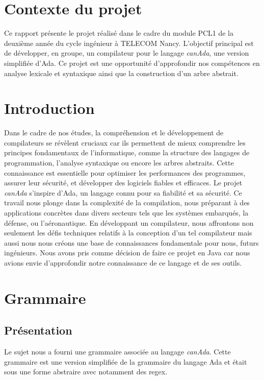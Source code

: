 \documentclass[french,a4paper]{article}
\begin{document}
    \section{Contexte du projet}\label{sec:contexte-du-projet}
    Ce rapport présente le projet réalisé dans le cadre du module PCL1 de la deuxième année du cycle ingénieur à TELECOM Nancy.
    L'objectif principal est de développer, en groupe, un compilateur pour le langage \textit{canAda}, une version simplifiée d'Ada.
    Ce projet est une opportunité d'approfondir nos compétences en analyse lexicale et syntaxique ainsi que la construction d'un arbre abstrait.

    \section{Introduction}\label{sec:introduction}
    Dans le cadre de nos études, la compréhension et le développement de compilateurs se révèlent cruciaux car ils permettent de mieux comprendre les principes fondamentaux de l'informatique, comme la structure des langages de programmation, l'analyse syntaxique ou encore les arbres abstraits.
    Cette connaissance est essentielle pour optimiser les performances des programmes, assurer leur sécurité, et développer des logiciels fiables et efficaces.
    Le projet \textit{canAda} s'inspire d'Ada, un langage connu pour sa fiabilité et sa sécurité.
    Ce travail nous plonge dans la complexité de la compilation, nous préparant à des applications concrètes dans divers secteurs tels que les systèmes embarqués, la défense, ou l'aéronautique.
    En développant un compilateur, nous affrontons non seulement les défis techniques relatifs à la conception d'un tel compilateur mais aussi nous nous créons une base de connaissances fondamentale pour nous, futurs ingénieurs.
    Nous avons pris comme décision de faire ce projet en Java car nous avions envie d'approfondir notre connaissance de ce langage et de ses outils.

    \section{Grammaire}\label{sec:grammaire}

    \subsection{Présentation}\label{subsec:presentation}
    Le sujet nous a fourni une grammaire associée au langage \textit{canAda}.
    Cette grammaire est une version simplifiée de la grammaire du langage Ada et était sous une forme abstraire avec notamment des regex.
\end{document}
